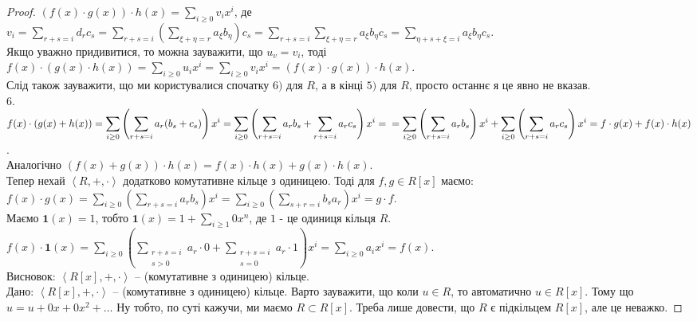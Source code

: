 \documentclass{math_library}
\begin{document}
\begin{proof}
$(f(x) \cdot g(x)) \cdot h(x) = \displaystyle\sum_{i \geq 0}v_i x^i$, де \\
$v_i = \displaystyle\sum_{r+s=i} d_r c_s = \sum_{r+s=i} \left( \sum_{\xi + \eta = r} a_\xi b_\eta \right) c_s = \sum_{r+s=i} \sum_{\xi + \eta = r} a_\xi b_\eta c_s = \sum_{\eta + s + \xi = i} a_\xi b_\eta c_s$.\\
Якщо уважно придивитися, то можна зауважити, що $u_v = v_i$, тоді\\
$f(x) \cdot (g(x) \cdot h(x)) = \displaystyle\sum_{i \geq 0} u_i x^i = \sum_{i \geq 0} v_i x^i = (f(x) \cdot g(x)) \cdot h(x)$.\\
Слід також зауважити, що ми користувалися спочатку $6)$ для $R$, а в кінці $5)$ для $R$, просто останнє я це явно не вказав.
\bigskip \\
6. $f(x) \cdot (g(x)+h(x)) = \displaystyle\sum_{i \geq 0} \left( \sum_{r+s=i} a_r (b_s + c_s) \right) x^i = \sum_{i \geq 0} \left( \sum_{r+s=i} a_r b_s + \sum_{r+s=i} a_r c_s \right) x^i = \\ =\sum_{i \geq 0} \left( \sum_{r+s=i} a_r b_s \right) x^i + \sum_{i \geq 0} \left( \sum_{r+s=i} a_r c_s \right) x^i = f \cdot g(x) + f(x) \cdot h(x)$.\\
Аналогічно $(f(x)+g(x)) \cdot h(x) = f(x) \cdot h(x) + g(x) \cdot h(x)$.
\bigskip \\
Тепер нехай $\left< R,+,\cdot\right>$ додатково комутативне кільце з одиницею. Тоді для $f,g \in R[x]$ маємо:\\
$f(x) \cdot g(x) = \displaystyle\sum_{i \geq 0} \left( \sum_{r+s=i} a_r b_s \right)x^i = \sum_{i \geq 0} \left( \sum_{s+r=i} b_s a_r \right)x^i = g \cdot f$.\\
Маємо $\textbf{1}(x) = 1$, тобто $\textbf{1}(x) = 1 + \displaystyle\sum_{i \geq 1} 0x^n$, де $1$ - це одиниця кільця $R$.\\
$f(x) \cdot \textbf{1}(x) = \displaystyle\sum_{i \geq 0} \left( \sum_{\substack{r+s=i \\ s > 0}} a_r \cdot 0 + \sum_{\substack{r+s=i \\ s=0}} a_r \cdot 1 \right) x^i = \sum_{i \geq 0} a_i x^i = f(x)$.\\
Висновок: $\left< R[x],+,\cdot\right>$ -- (комутативне з одиницею) кільце.
\bigskip \\
\rightproof Дано: $\left< R[x],+,\cdot\right>$ -- (комутативне з одиницею) кільце. Варто зауважити, що коли $u \in R$, то автоматично $u \in R[x]$. Тому що $u = u + 0x + 0x^2 + \dots$ Ну тобто, по суті кажучи, ми маємо $R \subset R[x]$. Треба лише довести, що $R$ є підкільцем $R[x]$, але це неважко.
\end{proof}
\end{document}
